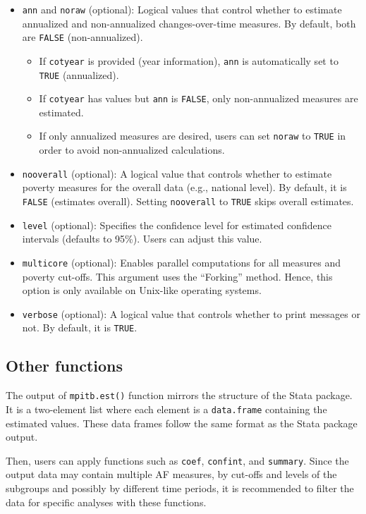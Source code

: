 \begin{itemize}
\item
  \texttt{ann} and \texttt{noraw} (optional): Logical values that control whether to estimate annualized and non-annualized changes-over-time measures. By default, both are \texttt{FALSE} (non-annualized).

  \begin{itemize}
  \item
    If \texttt{cotyear} is provided (year information), \texttt{ann} is automatically set to \texttt{TRUE} (annualized).
  \item
    If \texttt{cotyear} has values but \texttt{ann} is \texttt{FALSE}, only non-annualized measures are estimated.
  \item
    If only annualized measures are desired, users can set \texttt{noraw} to \texttt{TRUE} in order to avoid non-annualized calculations.
  \end{itemize}
\item
  \texttt{nooverall} (optional): A logical value that controls whether to estimate poverty measures for the overall data (e.g., national level). By default, it is \texttt{FALSE} (estimates overall). Setting \texttt{nooverall} to \texttt{TRUE} skips overall estimates.
\item
  \texttt{level} (optional): Specifies the confidence level for estimated confidence intervals (defaults to 95\%). Users can adjust this value.
\item
  \texttt{multicore} (optional): Enables parallel computations for all measures and poverty cut-offs. This argument uses the ``Forking'' method. Hence, this option is only available on Unix-like operating systems.
\item
  \texttt{verbose} (optional): A logical value that controls whether to print messages or not. By default, it is \texttt{TRUE}.
\end{itemize}

\subsection{Other functions}\label{other-functions}

The output of \texttt{mpitb.est()} function mirrors the structure of the Stata package. It is a two-element list where each element is a \texttt{data.frame} containing the estimated values. These data frames follow the same format as the Stata package output.

Then, users can apply functions such as \texttt{coef}, \texttt{confint}, and \texttt{summary}. Since the output data may contain multiple AF measures, by cut-offs and levels of the subgroups and possibly by different time periods, it is recommended to filter the data for specific analyses with these functions.


